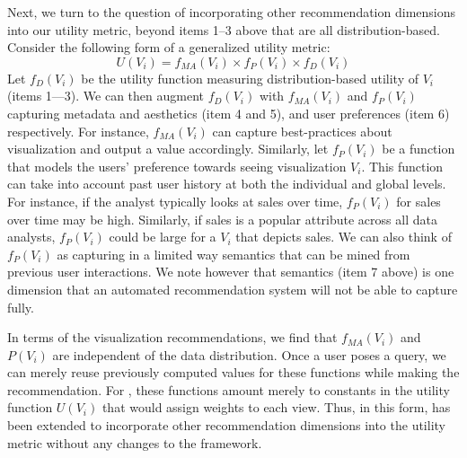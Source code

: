 {Next, we turn to the question of incorporating other recommendation dimensions into our utility 
metric, beyond items 1--3 above that are all distribution-based.
Consider the following form of a generalized utility metric:
$$ U (V_i) = f_{MA}(V_i) \times f_P (V_i) \times f_D (V_i)$$
Let $f_D (V_i)$ be the utility function measuring distribution-based utility of $V_i$ (items 1---3).
We can then augment $f_D (V_i)$ with $f_{MA}(V_i)$ and $f_P (V_i)$ capturing metadata  and aesthetics (item 4 and 5), and user preferences (item 6) respectively.
For instance, $f_{MA}(V_i)$ can capture best-practices about 
visualization and output a  value accordingly.
Similarly, let $f_P (V_i)$ be a function that models the users' preference towards seeing visualization $V_i$.
This function can take into account past user history at both the individual and global levels.
For instance, if the analyst typically looks at sales over time, $f_P (V_i)$ for sales over time
may be high.
Similarly, if sales is a popular attribute across all data analysts, $f_P (V_i)$ could be large for
a $V_i$ that depicts sales.
We can also think of $f_P (V_i)$ as capturing in a limited way semantics 
that can be mined from previous user interactions.
We note however that semantics (item 7 above) is one dimension that an automated 
recommendation system will not be able to capture fully.

In terms of the visualization recommendations, 
we find that $f_{MA}(V_i)$ and $P (V_i)$ are independent
of the data distribution.
Once a user poses a query, we can merely reuse previously 
computed values for these functions while
making the recommendation.
For \SeeDB, these functions amount merely to constants 
in the utility function $U (V_i)$ that would assign weights to each view.
Thus, in this form, \SeeDB has been extended to 
incorporate other recommendation dimensions into
the utility metric without any changes to the \SeeDB framework.



}
